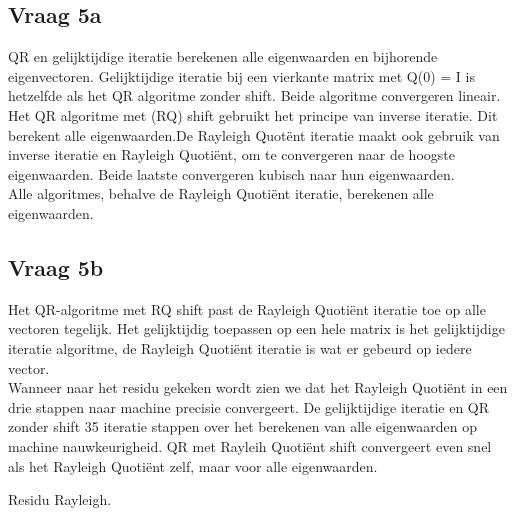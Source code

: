 \subsection*{Vraag 5a}
QR en gelijktijdige iteratie berekenen alle eigenwaarden en bijhorende eigenvectoren. Gelijktijdige iteratie bij een vierkante matrix met Q(0) = I is hetzelfde als het QR algoritme zonder shift. Beide algoritme convergeren lineair.\\ [12pt]

Het QR algoritme met (RQ) shift gebruikt het principe van inverse iteratie. Dit berekent alle eigenwaarden.De Rayleigh Quot\"ent iteratie maakt ook gebruik van inverse iteratie en Rayleigh Quoti\"ent, om te convergeren naar de hoogste eigenwaarden. Beide laatste convergeren kubisch naar hun eigenwaarden.\\ [12pt]

Alle algoritmes, behalve de Rayleigh Quoti\"ent iteratie, berekenen alle eigenwaarden.\\ [12pt]

\subsection*{Vraag 5b}
Het QR-algoritme met RQ shift past de Rayleigh Quoti\"ent iteratie toe op alle vectoren tegelijk. Het gelijktijdig toepassen op een hele matrix is het gelijktijdige iteratie algoritme, de Rayleigh Quoti\"ent iteratie is wat er gebeurd op iedere vector.\\[12pt]

Wanneer naar het residu gekeken wordt zien we dat het Rayleigh Quoti\"ent in een drie stappen naar machine precisie convergeert. De gelijktijdige iteratie en QR zonder shift 35 iteratie stappen over het berekenen van alle eigenwaarden op machine nauwkeurigheid. QR met Rayleih Quoti\"ent shift convergeert even snel als het Rayleigh Quoti\"ent zelf, maar voor alle eigenwaarden.\\[12 pt]
\begin{center}
\end{center}
\caption{Residu Rayleigh.}

